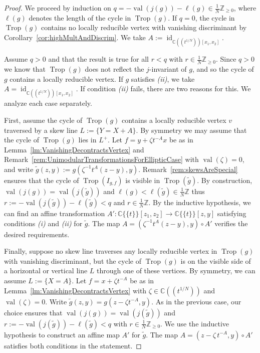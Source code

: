 \documentclass[11pt]{amsart}
\numberwithin{equation}{section}
\theoremstyle{plain}
\theoremstyle{definition}
\theoremstyle{remark}
\begin{document}
\begin{proof}
  We proceed by induction on $q=-\operatorname{val}(j(g))-\ell(g)\in
  \frac{1}{N}{\mathbb{Z}}_{\geq 0}$, where $\ell(g)$ denotes the length of the
  cycle in $\operatorname{Trop}(g)$.  If $q=0$, the cycle in $\operatorname{Trop}(g)$ contains no
  locally reducible vertex with vanishing discriminant by
  Corollary~\ref{cor:highMultAndDiscrim}. We take
  $A:=\operatorname{id}_{{{\mathbb{C}}(\!(t^{1/N})\!)}[x_1,x_2]}$.

  Assume $q>0$ and that the result is true for all $r<q$ with $r\in
  \frac{1}{N}{\mathbb{Z}}_{\geq 0}$.  Since $q>0$ we know that $\operatorname{Trop}(g)$ does
  not reflect the $j$-invariant of $g$, and so the cycle of $g$
  contains a locally reducible vertex. If $g$ satisfies \emph{(ii)},
  we take $A=\operatorname{id}_{{{\mathbb{C}}(\!(t^{1/N})\!)}[x_1,x_2]}$. If condition \emph{(ii)} fails,
  there are two reasons for this. We analyze each case separately.

  First, assume the cycle of $\operatorname{Trop}(g)$ contains a locally reducible
  vertex $v$ traversed by a skew line $L:=\{Y=X+A\}$. By symmetry we
  may assume that the cycle of $\operatorname{Trop}(g)$ lies in $L^+$. Let $f=y+{\zeta}
  t^{-A} x$ be as in Lemma~\ref{lm:VanishingDecontractsVertex} and
  Remark~\ref{rem:UnimodularTransformationsForEllipticCase} with
  $\operatorname{val}({\zeta})=0$, and write $\tilde{g}(z,y):=g({\zeta}^{-1}t^{A}(z-y),
  y)$. Remark~\ref{rem:skewsAreSpecial} ensures that the cycle of
  $\operatorname{Trop}(I_{g,f})$ is visible in $\operatorname{Trop}(\tilde{g})$. By construction,
  $\operatorname{val}(j(g))=\operatorname{val}(j(\tilde{g}))$ and $\ell(g)<\ell(\tilde{g})\in
  \frac{1}{N}{\mathbb{Z}}$ thus $r:=-\operatorname{val}(j(\tilde{g}))-\ell(\tilde{g})<q$ and
  $r\in \frac{1}{N}{\mathbb{Z}}$.  By the inductive hypothesis, we can find an
  affine transformation $A'\colon {{\mathbb{C}}\{\!\{t
\}\!\}}[z_1,z_2]\to {{\mathbb{C}}\{\!\{t
\}\!\}}[z,y]$ satisfying
  conditions \emph{(i)} and \emph{(ii)} for $\tilde{g}$. The map $A=
  ({\zeta}^{-1}t^{A}(z-y), y) \circ A'
  $ verifies the desired requirements.

  Finally, suppose no skew line traverses any locally reducible vertex
  in $\operatorname{Trop}(g)$ with vanishing discriminant, but the cycle of
  $\operatorname{Trop}(g)$ is on the visible side of a horizontal or vertical line
  $L$ through one of these vertices. By symmetry, we can assume
  $L:=\{X=A\}$.  Let $f=x+{\zeta} t^{-A}$ be as in
  Lemma~\ref{lm:VanishingDecontractsVertex} with ${\zeta}\in
  {\mathbb{C}}(\!(t^{1/N})\!)$ and $\operatorname{val}({\zeta})=0$. Write $\tilde{g}(z,y)=g(z-{\zeta}
  t^{-A},y)$. As in the previous case, our choice ensures that
  $\operatorname{val}(j(g))=\operatorname{val}(j(\tilde{g}))$ and
  $r:=-\operatorname{val}(j(\tilde{g}))-\ell(\tilde{g})<q$ with $r\in
  \frac{1}{N}{\mathbb{Z}}_{\geq 0}$. We use the inductive hypothesis to
  construct an affine map $A'$ for $\tilde{g}$. The map
  $A=(z-{\zeta}\,t^{-A},y)\circ A'$ satisfies both conditions in the
  statement.
\end{proof}
\end{document}
